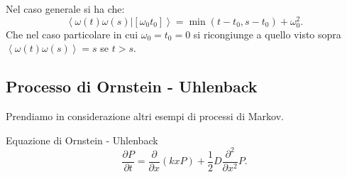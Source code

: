 \begin{itemize}
    Nel caso generale si ha che:
    \[
        \left<\omega (t)\omega (s)| \left[\omega_0t_0\right]\right> = \min(t-t_0, s-t_0) + \omega_0^2
    .\] 
    Che nel caso particolare in cui $\omega_0=t_0=0$ si ricongiunge a quello visto sopra $\left<\omega (t) \omega (s) \right> = s$ se $t>s$.
    \usetikzlibrary{math}
    \begin{center}
    \end{center}
    \noindent
\end{itemize}

\subsection{Processo di Ornstein - Uhlenback}%
\label{sub:Processo di Ornstein - Uhlenback}
Prendiamo in considerazione altri esempi di processi di Markov.
\begin{redbox}{Equazione di Ornstein - Uhlenback}
    \[
	\frac{\partial P}{\partial t} = \frac{\partial }{\partial x} (kxP) + \frac{1}{2}D\frac{\partial ^2}{\partial x^2} P
    .\] 
\end{redbox}
\noindent
